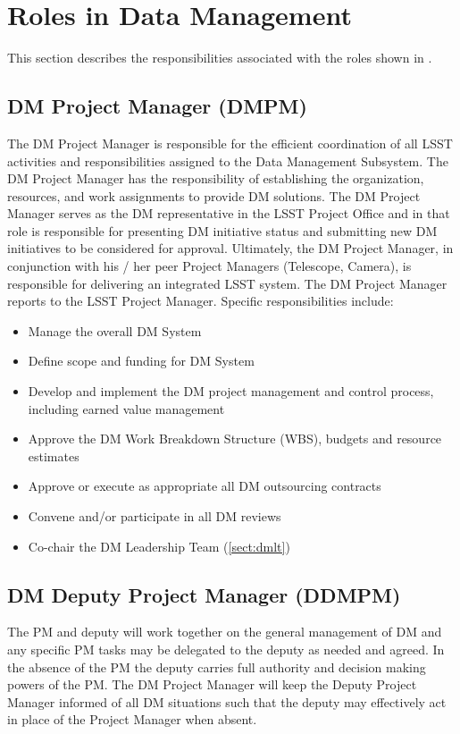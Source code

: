 \section{Roles in Data Management}

This section describes the responsibilities associated with the roles shown in
.


\subsection{DM Project Manager (DMPM)\label{role:dmpm}}

The DM Project Manager is responsible for the efficient coordination of all LSST activities and responsibilities assigned to the Data Management Subsystem. The DM Project Manager has the responsibility of establishing the organization, resources, and work assignments to provide DM solutions.  The DM Project Manager serves as the DM representative in the LSST Project Office and in that role is responsible for presenting DM initiative status and submitting new DM initiatives to be considered for approval. Ultimately, the DM Project Manager, in conjunction with his / her peer Project Managers (Telescope, Camera), is responsible for delivering an integrated LSST system. The DM Project Manager reports to the LSST Project Manager. Specific responsibilities include:

\begin{itemize}
\item Manage the overall DM System
\item Define scope and funding for DM System
\item Develop and implement the DM project management and control process, including earned value management
\item Approve the DM Work Breakdown Structure (WBS), budgets and resource estimates
\item Approve or execute as appropriate all DM outsourcing contracts
\item Convene and/or participate in all DM reviews
\item Co-chair the DM Leadership Team (\ref{sect:dmlt})
\end{itemize}

\subsection{DM Deputy Project Manager (DDMPM) \label{role:dmdpm}}

The PM and deputy will work together on the general management of DM and any specific PM tasks may be delegated to the deputy as needed and agreed. In the absence of the PM the deputy carries full authority and decision making powers of the PM. The DM Project Manager will keep the Deputy Project Manager informed of all DM situations such that the deputy may effectively act in place of the Project Manager when absent.

